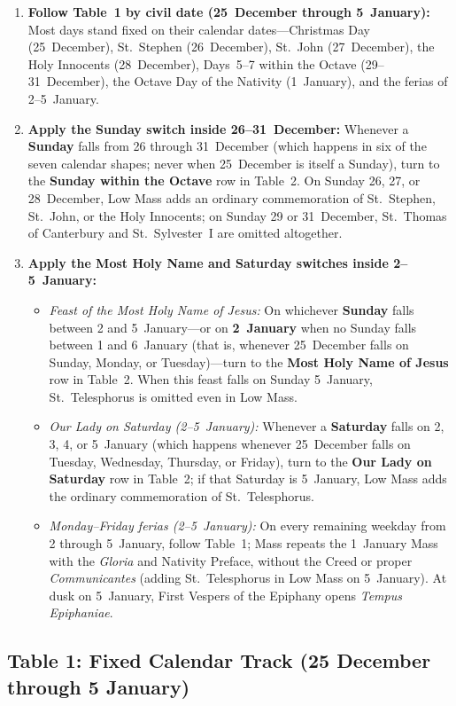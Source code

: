 \begin{enumerate}
\item \textbf{Follow Table~1 by civil date (25~December through 5~January):}
Most days stand fixed on their calendar dates---Christmas Day (25~December),
St.~Stephen (26~December), St.~John (27~December), the Holy Innocents
(28~December), Days~5--7 within the Octave (29--31~December), the Octave Day of
the Nativity (1~January), and the ferias of 2--5~January.
\item \textbf{Apply the Sunday switch inside 26--31~December:} Whenever a
\textbf{Sunday} falls from 26 through 31~December (which happens in six of the
seven calendar shapes; never when 25~December is itself a Sunday), turn to the
\textbf{Sunday within the Octave} row in Table~2. On Sunday 26, 27, or
28~December, Low Mass adds an ordinary commemoration of St.~Stephen, St.~John,
or the Holy Innocents; on Sunday 29 or 31~December, St.~Thomas of Canterbury and
St.~Sylvester~I are omitted altogether.
\item \textbf{Apply the Most Holy Name and Saturday switches inside
2--5~January:}
\begin{itemize}
\item \textit{Feast of the Most Holy Name of Jesus:} On whichever \textbf{Sunday}
falls between 2 and 5~January---or on \textbf{2~January} when no Sunday falls
between 1 and 6~January (that is, whenever 25~December falls on Sunday, Monday,
or Tuesday)---turn to the \textbf{Most Holy Name of Jesus} row in Table~2. When
this feast falls on Sunday 5~January, St.~Telesphorus is omitted even in Low
Mass.
\item \textit{Our Lady on Saturday (2--5~January):} Whenever a \textbf{Saturday}
falls on 2, 3, 4, or 5~January (which happens whenever 25~December falls on
Tuesday, Wednesday, Thursday, or Friday), turn to the \textbf{Our Lady on
Saturday} row in Table~2; if that Saturday is 5~January, Low Mass adds the
ordinary commemoration of St.~Telesphorus.
\item \textit{Monday--Friday ferias (2--5~January):} On every remaining weekday
from 2 through 5~January, follow Table~1; Mass repeats the 1~January Mass
with the \textit{Gloria} and Nativity Preface, without the Creed or proper
\textit{Communicantes} (adding St.~Telesphorus in Low Mass on 5~January). At
dusk on 5~January, First Vespers of the Epiphany opens \textit{Tempus
Epiphaniae}.
\end{itemize}
\end{enumerate}

\subsection{Table 1: Fixed Calendar Track (25 December through 5 January)}

